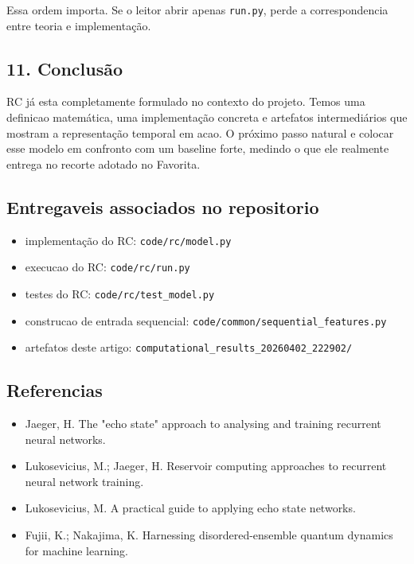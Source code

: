 \documentclass[12pt]{article}
\providecommand{\tightlist}{%
  \setlength{\itemsep}{0pt}\setlength{\parskip}{0pt}}
\begin{document}
Essa ordem importa. Se o leitor abrir apenas \texttt{run.py}, perde a correspondencia entre teoria e implementação.

\subsection{11. Conclusão}\label{11-conclusuxe3o}

RC já esta completamente formulado no contexto do projeto. Temos uma definicao matemática, uma implementação concreta e artefatos intermediários que mostram a representação temporal em acao. O próximo passo natural e colocar esse modelo em confronto com um baseline forte, medindo o que ele realmente entrega no recorte adotado no Favorita.

\subsection{Entregaveis associados no repositorio}\label{entregaveis-associados-no-repositorio}

\begin{itemize}
\tightlist
\item
  implementação do RC: \texttt{code/rc/model.py}
\item
  execucao do RC: \texttt{code/rc/run.py}
\item
  testes do RC: \texttt{code/rc/test\_model.py}
\item
  construcao de entrada sequencial: \texttt{code/common/sequential\_features.py}
\item
  artefatos deste artigo: \texttt{computational\_results\_20260402\_222902/}
\end{itemize}

\subsection{Referencias}\label{referencias}

\begin{itemize}
\tightlist
\item
  Jaeger, H. The "echo state" approach to analysing and training recurrent neural networks.
\item
  Lukosevicius, M.; Jaeger, H. Reservoir computing approaches to recurrent neural network training.
\item
  Lukosevicius, M. A practical guide to applying echo state networks.
\item
  Fujii, K.; Nakajima, K. Harnessing disordered-ensemble quantum dynamics for machine learning.
\end{itemize}
\end{document}
